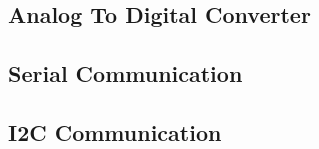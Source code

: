 \documentclass[a4paper,10pt,oneside]{article}
\begin{document}
		\subsection{\huge \textbf{Analog To Digital Converter}}
		\subsection{\huge \textbf{Serial Communication}}
		\subsection{\huge \textbf{I2C Communication}}
\end{document}

